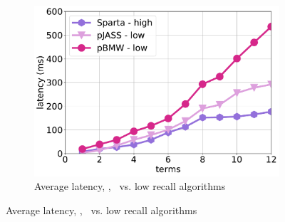 {{\begin{figure}[tbh]
\begin{subfigure}{0.32\textwidth}
         \includegraphics[width=\textwidth]{figures/latency_high_low_12threads_clueweb.pdf}
        \caption{Average latency, \cw, \alg\ vs. low recall algorithms}
        \label{fig:terms-scaling-low-avg}
      \end{subfigure}
         

\end{figure}}}
